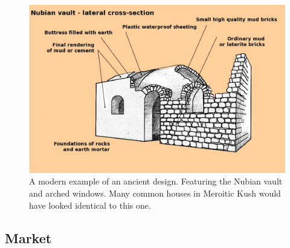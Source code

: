 \documentclass[a4paper,12pt]{scrreprt}
\begin{document}
\begin{figure}[H]
	\centering
	\includegraphics[width=\textwidth]{img/house/nubian_vault_sketch}
	\caption{A modern example of an ancient design. Featuring the Nubian vault and arched windows. Many common houses in Meroitic Kush would have looked identical to this one.}
\end{figure}

\subsection{Market}

\end{document}
